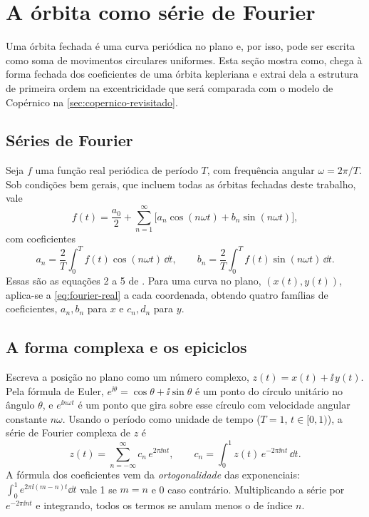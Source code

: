 \section{A órbita como série de Fourier}\label{cap:matematica}

Uma órbita fechada é uma curva periódica no plano e, por isso, pode ser escrita como soma de movimentos circulares uniformes. Esta seção mostra como, chega à forma fechada dos coeficientes de uma órbita kepleriana e extrai dela a estrutura de primeira ordem na excentricidade que será comparada com o modelo de Copérnico na \autoref{sec:copernico-revisitado}.

\subsection{Séries de Fourier}\label{sec:fourier-real}

Seja $f$ uma função real periódica de período $T$, com frequência angular $\omega = 2\pi/T$. Sob condições bem gerais, que incluem todas as órbitas fechadas deste trabalho, vale \cite{thomas2009}
\begin{equation}
  f(t) = \frac{a_0}{2} + \sum_{n=1}^{\infty}\bigl[a_n\cos(n\omega t) + b_n\sin(n\omega t)\bigr],
  \label{eq:fourier-real}
\end{equation}
com coeficientes
\begin{equation}
  a_n = \frac{2}{T}\int_0^T f(t)\cos(n\omega t)\,\dd t,\qquad
  b_n = \frac{2}{T}\int_0^T f(t)\sin(n\omega t)\,\dd t.
  \label{eq:fourier-coef-real}
\end{equation}
Essas são as equações 2 a 5 de . Para uma curva no plano, $(x(t),y(t))$, aplica-se a \autoref{eq:fourier-real} a cada coordenada, obtendo quatro famílias de coeficientes, $a_n,b_n$ para $x$ e $c_n,d_n$ para $y$.

\subsection{A forma complexa e os epiciclos}\label{sec:fourier-complexa}

Escreva a posição no plano como um número complexo, $z(t) = x(t) + \ii\,y(t)$. Pela fórmula de Euler, $e^{\ii\theta} = \cos\theta + \ii\sin\theta$ é um ponto do círculo unitário no ângulo $\theta$, e $e^{\ii n\omega t}$ é um ponto que gira sobre esse círculo com velocidade angular constante $n\omega$. Usando o período como unidade de tempo ($T=1$, $t\in[0,1)$), a série de Fourier complexa de $z$ é
\begin{equation}
  z(t) = \sum_{n=-\infty}^{\infty} c_n\,e^{2\pi\ii n t},
  \qquad
  c_n = \int_0^1 z(t)\,e^{-2\pi\ii n t}\,\dd t.
  \label{eq:fourier-complexa}
\end{equation}
A fórmula dos coeficientes vem da \emph{ortogonalidade} das exponenciais: $\int_0^1 e^{2\pi\ii (m-n)t}\dd t$ vale 1 se $m=n$ e 0 caso contrário. Multiplicando a série por $e^{-2\pi\ii n t}$ e integrando, todos os termos se anulam menos o de índice $n$.

